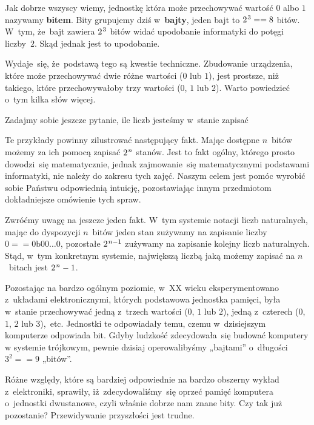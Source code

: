 \documentclass[10pt,t]{beamer}
\begin{document}
    Jak dobrze wszyscy wiemy, jednostkę która może przechowywać wartość
  $0$ albo $1$ nazywamy \textbf{bitem}. Bity grupujemy dziś
  w~\textbf{bajty},
  jeden bajt to $2^{ \hspace{0.07em} 3 } == 8$ bitów. W~tym, że~bajt zawiera
  $2^{ \hspace{0.07em} 3 }$ bitów widać upodobanie informatyki do potęgi
  liczby~$2$. Skąd jednak jest to upodobanie.

  Wydaje~się, że~podstawą tego są kwestie techniczne. Zbudowanie urządzenia,
  które może przechowywać dwie różne wartości ($0$ lub $1$), jest prostsze,
  niż takiego, które przechowywałoby trzy wartości ($0$, $1$ lub $2$).
  Warto powiedzieć o~tym kilka słów więcej.

  Zadajmy sobie jeszcze pytanie, ile liczb jesteśmy w~stanie zapisać


  Te przykłady powinny zilustrować następujący fakt. Mając dostępne
  $n$~bitów możemy za ich pomocą zapisać $2^{ \hspace{0.07em} n }$ stanów. Jest
  to fakt ogólny, którego prosto dowodzi~się matematycznie, jednak
  zajmowanie~się matematycznymi podstawami informatyki, nie należy do zakresu
  tych zajęć. Naszym celem jest pomóc wyrobić sobie Państwu odpowiednią
  intuicję, pozostawiając innym przedmiotom dokładniejsze omówienie tych
  spraw.

  Zwróćmy uwagę na jeszcze jeden fakt. W~tym systemie notacji liczb
  naturalnych, mając do dyspozycji $n$~bitów jeden stan zużywamy na zapisanie
  liczby $0 == 0\text{b}00\ldots0$, pozostałe $2^{ \hspace{0.07em} n - 1 }$ zużywamy
  na zapisanie kolejny liczb naturalnych. Stąd, w~tym konkretnym
  systemie, największą liczbą jaką możemy zapisać na $n$~bitach
  jest $2^{ \hspace{0.07em} n } - 1$.

    Pozostając na bardzo ogólnym poziomie, w~XX wieku eksperymentowano
  z~układami elektronicznymi, których podstawowa jednostka pamięci, była
  w~stanie przechowywać jedną z~trzech wartości ($0$, $1$ lub $2$), jedną
  z~czterech ($0$, $1$, $2$ lub $3$),~etc. Jednostki te odpowiadały temu,
  czemu w~dzisiejszym komputerze odpowiada bit. Gdyby ludzkość
  zdecydowała~się budować komputery w systemie trójkowym, pewnie dzisiaj
  operowalibyśmy „bajtami” o~długości $3^{ 2 } == 9$ „bitów”.

  Różne względy, które są bardziej odpowiednie na bardzo obszerny wykład
  z~elektroniki, sprawiły, iż~zdecydowaliśmy~się oprzeć pamięć komputera
  o~jednostki dwustanowe, czyli właśnie dobrze nam znane bity. Czy tak już
  pozostanie? Przewidywanie przyszłości jest trudne.
\end{document}

